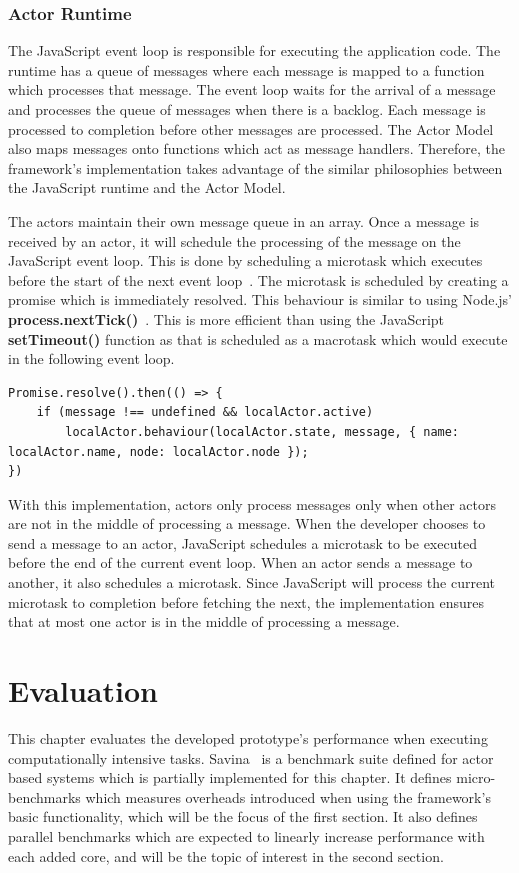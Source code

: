 \documentclass[12pt, a4paper]{report}
\theoremstyle{definition}
\theoremstyle{definition}%
\theoremstyle{definition}%
\theoremstyle{definition}%
\theoremstyle{definition}%
\theoremstyle{definition}%
\begin{document}
\subsection{Actor Runtime}
The JavaScript event loop is responsible for executing the application code. The runtime has a queue of messages where each message is mapped to a function which processes that message. The event loop waits for the arrival of a message and processes the queue of messages when there is a backlog. Each message is processed to completion before other messages are processed. The Actor Model also maps messages onto functions which act as message handlers. Therefore, the framework's implementation takes advantage of the similar philosophies between the JavaScript runtime and the Actor Model.

The actors maintain their own message queue in an array. Once a message is received by an actor, it will schedule the processing of the message on the JavaScript event loop. This is done by scheduling a microtask which executes before the start of the next event loop~\cite{eventloopbrowser}\cite{eventloopnode}. The microtask is scheduled by creating a promise which is immediately resolved. This behaviour is similar to using Node.js' \textbf{process.nextTick()}~\cite{nexttick}. This is more efficient than using the JavaScript \textbf{setTimeout()} function as that is scheduled as a macrotask which would execute in the following event loop.
\begin{lstlisting}
Promise.resolve().then(() => {
    if (message !== undefined && localActor.active)
        localActor.behaviour(localActor.state, message, { name: localActor.name, node: localActor.node });
})
\end{lstlisting}

With this implementation, actors only process messages only when other actors are not in the middle of processing a message. When the developer chooses to send a message to an actor, JavaScript schedules a microtask to be executed before the end of the current event loop. When an actor sends a message to another, it also schedules a microtask. Since JavaScript will process the current microtask to completion before fetching the next, the implementation ensures that at most one actor is in the middle of processing a message.
\chapter{Evaluation}
This chapter evaluates the developed prototype's performance when executing computationally intensive tasks. Savina~\cite{savina} is a benchmark suite defined for actor based systems which is partially implemented for this chapter. It defines micro-benchmarks which measures overheads introduced when using the framework's basic functionality, which will be the focus of the first section. It also defines parallel benchmarks which are expected to linearly increase performance with each added core, and will be the topic of interest in the second section.
\end{document}

